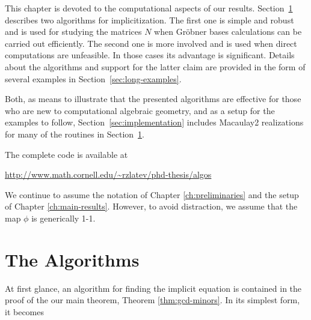 \documentclass[fleqn,reqno]{amsart}
\newcounter{chapter}
\numberwithin{first}{chapter}
\begin{document}

\begin{paragraf*}
This chapter is devoted to the computational aspects of our results.
Section~\ref{sec:algorithms} describes two algorithms for implicitization.
The first one is simple and robust and is used for studying the matrices $N$
when Gr\"obner bases calculations can be carried out efficiently.
The second one is more involved and is used when direct computations are unfeasible.
In those cases its advantage is significant.
Details about the algorithms and support for the latter claim
are provided in the form of several examples in Section~\ref{sec:long-examples}.
\end{paragraf*}

\begin{paragraf*}
Both, as means to illustrate that the presented algorithms are effective for those who are
new to computational algebraic geometry,
and as a setup for the examples to follow,
Section~\ref{sec:implementation} includes Macaulay2 realizations for many
of the routines in Section~\ref{sec:algorithms}.
\end{paragraf*}

\begin{paragraf*}
The complete code is available at
\begin{center}
	\url{http://www.math.cornell.edu/~rzlatev/phd-thesis/algos}
\end{center}
\end{paragraf*}

\begin{paragraf*}
We continue to assume the notation of Chapter \ref{ch:preliminaries}
and the setup of Chapter \ref{ch:main-results}.
However, to avoid distraction, we assume that the map $\phi$ is generically 1-1.
\end{paragraf*}



\section{The Algorithms}
\label{sec:algorithms}

\begin{paragraf*}
At first glance, an algorithm for finding the implicit equation is contained in the proof
of the our main theorem, Theorem \ref{thm:gcd-minors}.
In its simplest form, it becomes
\end{paragraf*}
\end{document}
